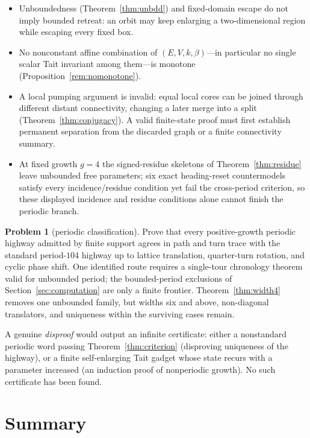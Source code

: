 \documentclass[11pt,reqno]{amsart}
\theoremstyle{plain}
\theoremstyle{definition}
\newtheorem{problem}[theorem]{Problem}
\newcommand{\growth}{g}
\begin{document}
\begin{itemize}[leftmargin=1.4em]
\item Unboundedness (Theorem~\ref{thm:unbdd}) and fixed-domain escape do not
imply bounded retreat: an orbit may keep enlarging a two-dimensional region while
escaping every fixed box.
\item No nonconstant affine combination of $(E,V,k,\beta)$---in particular no single
scalar Tait invariant among them---is monotone (Proposition~\ref{rem:nomonotone}).
\item A local pumping argument is invalid: equal local cores can be joined
through different distant connectivity, changing a later merge into a split
(Theorem~\ref{thm:conjugacy}). A valid finite-state proof must first establish
permanent separation from the discarded graph or a finite connectivity summary.
\item At fixed growth $\growth=4$ the signed-residue skeletons of
Theorem~\ref{thm:residue} leave unbounded free parameters; six exact
heading-reset countermodels satisfy every incidence/residue condition yet fail
the cross-period criterion, so these displayed incidence and residue conditions
alone cannot finish the periodic branch.
\end{itemize}

\begin{problem}[periodic classification]\label{prob:periodic}
Prove that every positive-growth periodic highway admitted by finite support agrees
in path and turn trace with the standard period-$104$ highway up to lattice
translation, quarter-turn rotation, and cyclic phase shift.
One identified route requires a single-tour chronology theorem valid for unbounded period; the
bounded-period exclusions of Section~\ref{sec:computation} are only a finite
frontier.  Theorem~\ref{thm:width4} removes one unbounded family, but widths six and
above, non-diagonal translators, and uniqueness within the surviving cases remain.
\end{problem}

A genuine \emph{disproof} would output an infinite certificate: either a
nonstandard periodic word passing Theorem~\ref{thm:criterion} (disproving
uniqueness of the highway), or a finite self-enlarging Tait gadget whose state
recurs with a parameter increased (an induction proof of nonperiodic growth). No
such certificate has been found.

\section{Summary}
\end{document}
